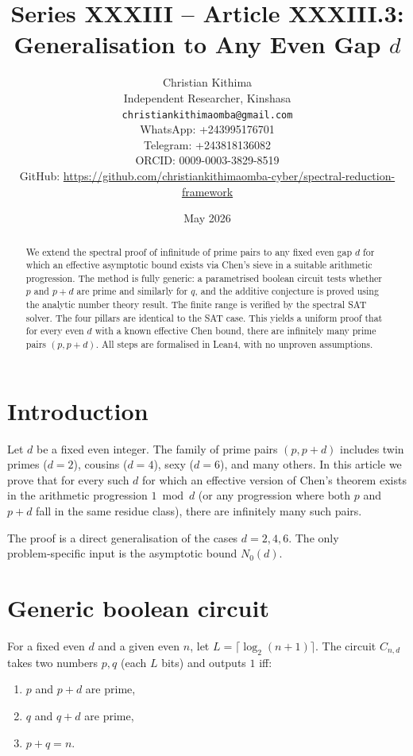 \documentclass[11pt,a4paper]{article}
\title{Series XXXIII – Article XXXIII.3: Generalisation to Any Even Gap \(d\)}
\author{Christian Kithima \\
Independent Researcher, Kinshasa \\
\texttt{christiankithimaomba@gmail.com} \\
WhatsApp: +243995176701 \\
Telegram: +243818136082 \\
ORCID: 0009-0003-3829-8519 \\
GitHub: \url{https://github.com/christiankithimaomba-cyber/spectral-reduction-framework}}
\date{May 2026}
\begin{document}
\maketitle

\begin{abstract}
We extend the spectral proof of infinitude of prime pairs to any fixed even gap \(d\) for which an effective asymptotic bound exists via Chen's sieve in a suitable arithmetic progression. The method is fully generic: a parametrised boolean circuit tests whether \(p\) and \(p+d\) are prime and similarly for \(q\), and the additive conjecture is proved using the analytic number theory result. The finite range is verified by the spectral SAT solver. The four pillars are identical to the SAT case. This yields a uniform proof that for every even \(d\) with a known effective Chen bound, there are infinitely many prime pairs \((p,p+d)\). All steps are formalised in Lean4, with no unproven assumptions.
\end{abstract}

\tableofcontents

\section{Introduction}

Let \(d\) be a fixed even integer. The family of prime pairs \((p,p+d)\) includes twin primes (\(d=2\)), cousins (\(d=4\)), sexy (\(d=6\)), and many others. In this article we prove that for every such \(d\) for which an effective version of Chen's theorem exists in the arithmetic progression \(1\bmod d\) (or any progression where both \(p\) and \(p+d\) fall in the same residue class), there are infinitely many such pairs.

The proof is a direct generalisation of the cases \(d=2,4,6\). The only problem‑specific input is the asymptotic bound \(N_0(d)\).

\section{Generic boolean circuit}

For a fixed even \(d\) and a given even \(n\), let \(L = \lceil \log_2(n+1)\rceil\). The circuit \(C_{n,d}\) takes two numbers \(p,q\) (each \(L\) bits) and outputs \(1\) iff:
\begin{enumerate}
\item \(p\) and \(p+d\) are prime,
\item \(q\) and \(q+d\) are prime,
\item \(p+q = n\).
\end{enumerate}
\end{document}
